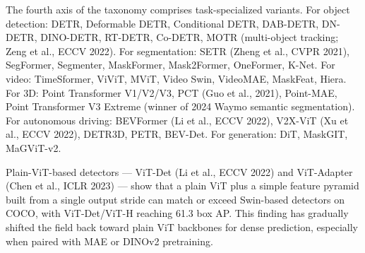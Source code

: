 The fourth axis of the taxonomy comprises task-specialized variants. For object detection: DETR, Deformable DETR, Conditional DETR, DAB-DETR, DN-DETR, DINO-DETR, RT-DETR, Co-DETR, MOTR (multi-object tracking; Zeng et al., ECCV 2022). For segmentation: SETR (Zheng et al., CVPR 2021), SegFormer, Segmenter, MaskFormer, Mask2Former, OneFormer, K-Net. For video: TimeSformer, ViViT, MViT, Video Swin, VideoMAE, MaskFeat, Hiera. For 3D: Point Transformer V1/V2/V3, PCT (Guo et al., 2021), Point-MAE, Point Transformer V3 Extreme (winner of 2024 Waymo semantic segmentation). For autonomous driving: BEVFormer (Li et al., ECCV 2022), V2X-ViT (Xu et al., ECCV 2022), DETR3D, PETR, BEV-Det. For generation: DiT, MaskGIT, MaGViT-v2.

Plain-ViT-based detectors --- ViT-Det (Li et al., ECCV 2022) and ViT-Adapter (Chen et al., ICLR 2023) --- show that a plain ViT plus a simple feature pyramid built from a single output stride can match or exceed Swin-based detectors on COCO, with ViT-Det/ViT-H reaching 61.3 box AP. This finding has gradually shifted the field back toward plain ViT backbones for dense prediction, especially when paired with MAE or DINOv2 pretraining.

